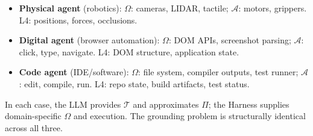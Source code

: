 \begin{itemize}
\item \textbf{Physical agent} (robotics): \(\Omega\): cameras, LIDAR, tactile; \(\mathcal{A}\): motors, grippers. L4: positions, forces, occlusions.

\item \textbf{Digital agent} (browser automation): \(\Omega\): DOM APIs, screenshot parsing; \(\mathcal{A}\): click, type, navigate. L4: DOM structure, application state.

\item \textbf{Code agent} (IDE/software): \(\Omega\): file system, compiler outputs, test runner; \(\mathcal{A}\): edit, compile, run. L4: repo state, build artifacts, test status.
\end{itemize}

In each case, the LLM provides \(\mathcal{T}\) and approximates \(\Pi\); the Harness supplies domain-specific \(\Omega\) and execution. The grounding problem is structurally identical across all three.

